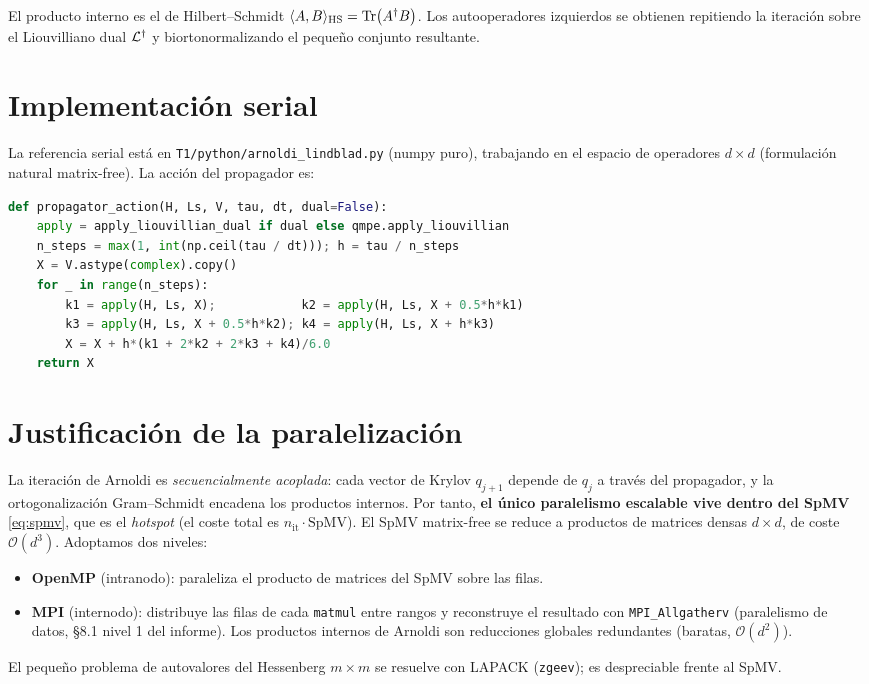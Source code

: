El producto interno es el de Hilbert--Schmidt $\langle A,B\rangle_{\mathrm{HS}}=\Tr(A^\dagger B)$.
Los autooperadores izquierdos se obtienen repitiendo la iteración sobre el
Liouvilliano dual $\mathcal{L}^\dagger$ y biortonormalizando el pequeño conjunto
resultante.

\section{Implementación serial}

La referencia serial está en \texttt{T1/python/arnoldi\_lindblad.py} (numpy puro),
trabajando en el espacio de operadores $d\times d$ (formulación natural
matrix-free). La acción del propagador es:
\begin{lstlisting}[language=Python,caption={Accion del propagador exp(tau L)[V] por RK4, matrix-free (extracto).}]
def propagator_action(H, Ls, V, tau, dt, dual=False):
    apply = apply_liouvillian_dual if dual else qmpe.apply_liouvillian
    n_steps = max(1, int(np.ceil(tau / dt))); h = tau / n_steps
    X = V.astype(complex).copy()
    for _ in range(n_steps):
        k1 = apply(H, Ls, X);            k2 = apply(H, Ls, X + 0.5*h*k1)
        k3 = apply(H, Ls, X + 0.5*h*k2); k4 = apply(H, Ls, X + h*k3)
        X = X + h*(k1 + 2*k2 + 2*k3 + k4)/6.0
    return X
\end{lstlisting}

\section{Justificación de la paralelización}

La iteración de Arnoldi es \emph{secuencialmente acoplada}: cada vector de Krylov
$q_{j+1}$ depende de $q_j$ a través del propagador, y la ortogonalización
Gram--Schmidt encadena los productos internos. Por tanto, \textbf{el único
paralelismo escalable vive dentro del SpMV} \cref{eq:spmv}, que es el
\emph{hotspot} (el coste total es $n_{\mathrm{it}}\cdot\text{SpMV}$). El SpMV
matrix-free se reduce a productos de matrices densas $d\times d$, de coste
$\mathcal{O}(d^3)$. Adoptamos dos niveles:
\begin{itemize}
  \item \textbf{OpenMP} (intranodo): paraleliza el producto de matrices del SpMV
  sobre las filas.
  \item \textbf{MPI} (internodo): distribuye las filas de cada \texttt{matmul}
  entre rangos y reconstruye el resultado con \texttt{MPI\_Allgatherv}
  (paralelismo de datos, \S 8.1 nivel 1 del informe). Los productos internos de
  Arnoldi son reducciones globales redundantes (baratas, $\mathcal{O}(d^2)$).
\end{itemize}
El pequeño problema de autovalores del Hessenberg $m\times m$ se resuelve con
LAPACK (\texttt{zgeev}); es despreciable frente al SpMV.

